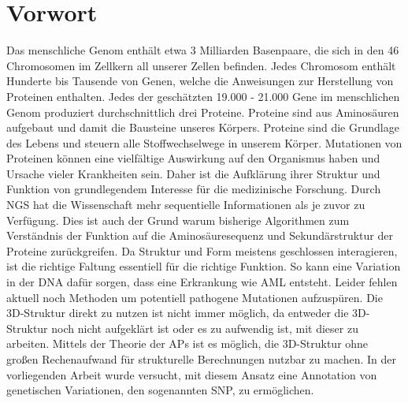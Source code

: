 \chapter{Vorwort}

Das menschliche Genom enthält etwa 3 Milliarden Basenpaare, die sich in den 46 Chromosomen im Zellkern all unserer Zellen befinden. Jedes Chromosom enthält Hunderte bis Tausende von Genen, welche die Anweisungen zur Herstellung von Proteinen enthalten. Jedes der geschätzten 19.000 - 21.000 Gene\cite{Ezkurdia.2014} im menschlichen Genom produziert durchschnittlich drei Proteine. Proteine sind aus Aminosäuren aufgebaut und damit die Bausteine unseres Körpers. Proteine sind die Grundlage des Lebens und steuern alle Stoffwechselwege in unserem Körper. Mutationen von Proteinen können eine vielfältige Auswirkung auf den Organismus haben und Ursache vieler Krankheiten sein. Daher ist die Aufklärung ihrer Struktur und Funktion von grundlegendem Interesse für die medizinische Forschung. 
Durch \ac{NGS} hat die Wissenschaft mehr sequentielle Informationen als je zuvor zu Verfügung. Dies ist auch der Grund warum bisherige Algorithmen zum Verständnis der Funktion auf die Aminosäuresequenz und Sekundärstruktur der Proteine zurückgreifen. Da Struktur und Form meistens geschlossen interagieren, ist die richtige Faltung essentiell für die richtige Funktion. So kann eine Variation in der \ac{DNA} dafür sorgen, dass eine Erkrankung wie \acf{AML} entsteht. Leider fehlen aktuell noch Methoden um potentiell pathogene Mutationen aufzuspüren. Die 3D-Struktur direkt zu nutzen ist nicht immer möglich, da entweder die 3D-Struktur noch nicht aufgeklärt ist oder es zu aufwendig ist, mit dieser zu arbeiten. Mittels der Theorie der \ac{APs} ist es möglich, die 3D-Struktur ohne großen Rechenaufwand für strukturelle Berechnungen nutzbar zu machen. In der vorliegenden Arbeit wurde versucht, mit diesem Ansatz eine Annotation von genetischen Variationen, den sogenannten \ac{SNP}, zu ermöglichen.
